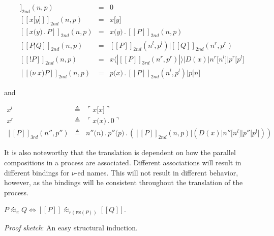 \documentclass[]{entcs}
\newcommand{\ldb}{[\![}
\newcommand{\rdb}{]\!]}
\newcommand{\lliftb}{\langle\!|}
\newcommand{\rliftb}{|\!\rangle}
\newcommand{\lpquote}{\ulcorner}
\newcommand{\rpquote}{\urcorner}
\newcommand{\id}[1]{\texttt{#1}}
\newcommand{\pzero}{\mathbin{0}}
\newcommand{\juxtap}{\mathbin{\id{|}}}
\newcommand{\concat}{\mathbin{.}}
\newcommand{\binpar}[2]{#1 \juxtap #2}
\newcommand{\outputp}[2]{#1 \id{[} #2 \id{]}}
\newcommand{\prefix}[3]{#1 \id{(} #2 \id{)} \concat #3}
\newcommand{\lift}[2]{#1 \lliftb #2 \rliftb}
\newcommand{\quotep}[1]{\lpquote #1 \rpquote}
\newcommand{\meaningof}[1]{\ldb #1 \rdb}
\newcommand{\wbbisim}{\stackrel{\centerdot}{\approx}} %
\begin{document}
\begin{eqnarray}
   	\meaningof{\pzero}_{2nd} (  n, p )
   		& = &
   		 \pzero \nonumber\\
   	\meaningof{x \id{[} y \id{]}}_{2nd} (  n, p ) 
  		& = & 
  		x \id{[} y \id{]} \nonumber\\
   	\meaningof{x \id{(} y \id{)} \concat P}_{2nd} (  n, p ) 
   		& = & 
 		x \id{(} y \id{)} \concat \meaningof{P}_{2nd} (  n, p ) \nonumber\\
   	\meaningof{P \juxtap Q}_{2nd} (  n, p ) 
   		& = & 
 		\meaningof{P}_{2nd} ( n^{l}, p^{l} )
   			 \juxtap \meaningof{Q}_{2nd} ( n^{r}, p^{r} ) \nonumber\\
   	\meaningof{\id{!} P}_{2nd} (  n, p )
   		& = & \binpar{\lift{x}{\meaningof{P}_{3rd}( n^{r}, p^{r} )}}
		             {\binpar{D(x)}{\binpar{\outputp{n^{r}}{n^{l}}}{\outputp{p^{r}}{p^{l}}}}} \nonumber\\
   	\meaningof{\id{(}\nu \; x \id{)} P}_{2nd} (  n, p ) 
   		& = & 
 		\prefix{p}{x}{\binpar{\meaningof{P}_{2nd} ( n^{l}, p^{l} )}{\outputp{p}{n}}} \nonumber
\end{eqnarray}

and

\begin{eqnarray}
	x^{l} & \triangleq & \quotep{\outputp{x}{x}} \nonumber\\
	x^{r} & \triangleq & \quotep{\prefix{x}{x}{\pzero}} \nonumber\\
	\meaningof{P}_{3rd}( n'', p'' ) 
		& \triangleq & 
			\prefix{n''}{n}{\prefix{p''}{p}{(\binpar{\meaningof{P}_{2nd}(  n, p )}
							        {(\binpar{D(x)}{\binpar{\outputp{n''}{n^{l}}}{\outputp{p''}{p^{l}}}})})}} \nonumber
\end{eqnarray}
	
\begin{remark}
	It is also noteworthy that the translation is dependent on how
	the parallel compositions in a process are
	associated. Different associations will result in different
	bindings for $\nu$-ed names. This will not result in different
	behavior, however, as the bindings will be consistent
	throughout the translation of the process.
\end{remark}

\begin{theorem}[Correctness]	
	$P \wbbisim_{\pi} Q \iff \ldb P \rdb \wbbisim_{r(\texttt{FN}(P))} \ldb Q \rdb$.
\end{theorem}

\emph{Proof sketch}: An easy structural induction.
\end{document}
